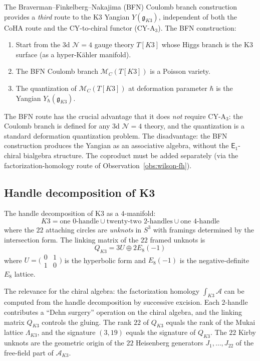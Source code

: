 \documentclass[11pt]{article}
\newcommand{\cA}{\mathcal{A}}
\newcommand{\cM}{\mathcal{M}}
\newcommand{\cN}{\mathcal{N}}
\newcommand{\fg}{\mathfrak{g}}
\newcommand{\Eone}{\mathsf{E}_1}
\begin{document}
\begin{observation}[BFN Coulomb = third route, independent of CY-A$_3$]
\label{obs:bfn-coulomb}
The Braverman--Finkelberg--Nakajima (BFN) Coulomb branch construction
provides a \emph{third} route to the K3 Yangian $Y(\fg_{K3})$,
independent of both the CoHA route and the CY-to-chiral functor
(CY-A$_3$). The BFN construction:
\begin{enumerate}[label=\textup{(\roman*)}]
 \item Start from the $3$d $\cN = 4$ gauge theory $T[K3]$ whose
 Higgs branch is the K3 surface (as a hyper-K\"ahler manifold).
 \item The BFN Coulomb branch $\cM_C(T[K3])$ is a Poisson variety.
 \item The quantization of $\cM_C(T[K3])$ at deformation parameter
 $\hbar$ is the Yangian $Y_\hbar(\fg_{K3})$.
\end{enumerate}
The BFN route has the crucial advantage that it does \emph{not}
require CY-A$_3$: the Coulomb branch is defined for any $3$d
$\cN = 4$ theory, and the quantization is a standard deformation
quantization problem. The disadvantage: the BFN construction
produces the Yangian as an associative algebra, without the
$\Eone$-chiral bialgebra structure. The coproduct must be added
separately (via the factorization-homology route of
Observation~\ref{obs:wilson-fh}).
\end{observation}

\subsection{Handle decomposition of K3}
\label{subsec:handle-decomp}

\begin{observation}[K3 = 22 Kirby framed unknots]
\label{obs:k3-handle}
The handle decomposition of K3 as a $4$-manifold:
\[
 K3 = \text{one $0$-handle} \cup \text{twenty-two $2$-handles}
 \cup \text{one $4$-handle}
\]
where the $22$ attaching circles are \emph{unknots} in $S^3$ with
framings determined by the intersection form. The linking matrix of
the $22$ framed unknots is
\[
 Q_{K3} = 3U \oplus 2E_8(-1)
\]
where $U = \bigl(\begin{smallmatrix} 0 & 1 \\ 1 & 0 \end{smallmatrix}\bigr)$
is the hyperbolic form and $E_8(-1)$ is the negative-definite $E_8$
lattice.

The relevance for the chiral algebra: the factorization homology
$\int_{K3} \cA$ can be computed from the handle decomposition by
successive excision. Each $2$-handle contributes a ``Dehn surgery''
operation on the chiral algebra, and the linking matrix $Q_{K3}$
controls the gluing. The rank $22$ of $Q_{K3}$ equals the rank of
the Mukai lattice $\Lambda_{K3}$, and the signature $(3, 19)$ equals
the signature of $Q_{K3}$. The $22$ Kirby unknots are the geometric
origin of the $22$ Heisenberg generators $J_1, \ldots, J_{22}$ of
the free-field part of $\cA_{K3}$.
\end{observation}
\end{document}
